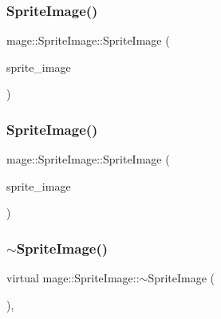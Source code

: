 \hypertarget{classmage_1_1_sprite_image_a7270677b4960320d3cf43cd8c4a0ed36}{}\label{classmage_1_1_sprite_image_a7270677b4960320d3cf43cd8c4a0ed36} 
\subsubsection{\texorpdfstring{Sprite\+Image()}{SpriteImage()}\hspace{0.1cm}{\footnotesize\ttfamily [3/4]}}
{\footnotesize\ttfamily mage\+::\+Sprite\+Image\+::\+Sprite\+Image (\begin{DoxyParamCaption}\item[{const \hyperlink{classmage_1_1_sprite_image}{Sprite\+Image} \&}]{sprite\+\_\+image }\end{DoxyParamCaption})\hspace{0.3cm}{\ttfamily [default]}}

\hypertarget{classmage_1_1_sprite_image_aa8e053469bd4032560c315e9f2a7c14b}{}\label{classmage_1_1_sprite_image_aa8e053469bd4032560c315e9f2a7c14b} 
\subsubsection{\texorpdfstring{Sprite\+Image()}{SpriteImage()}\hspace{0.1cm}{\footnotesize\ttfamily [4/4]}}
{\footnotesize\ttfamily mage\+::\+Sprite\+Image\+::\+Sprite\+Image (\begin{DoxyParamCaption}\item[{\hyperlink{classmage_1_1_sprite_image}{Sprite\+Image} \&\&}]{sprite\+\_\+image }\end{DoxyParamCaption})\hspace{0.3cm}{\ttfamily [default]}}

\hypertarget{classmage_1_1_sprite_image_ac5e53addd73b174c6b23d3f0d63260c1}{}\label{classmage_1_1_sprite_image_ac5e53addd73b174c6b23d3f0d63260c1} 
\subsubsection{\texorpdfstring{$\sim$\+Sprite\+Image()}{~SpriteImage()}}
{\footnotesize\ttfamily virtual mage\+::\+Sprite\+Image\+::$\sim$\+Sprite\+Image (\begin{DoxyParamCaption}{ }\end{DoxyParamCaption})\hspace{0.3cm}{\ttfamily [virtual]}, {\ttfamily [default]}}



